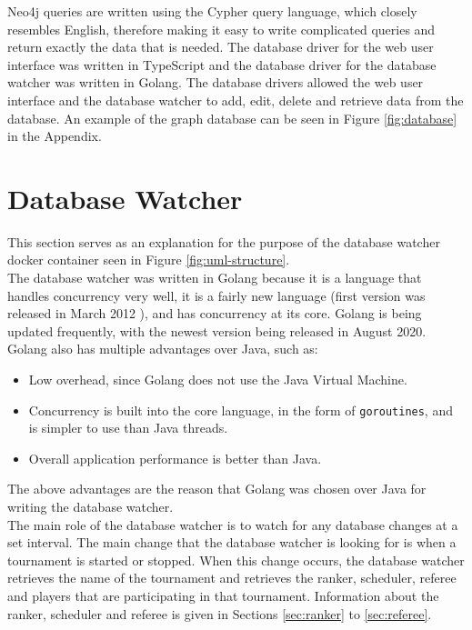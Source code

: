 \documentclass[a4paper, 11pt]{report}
\begin{document}
Neo4j queries are written using the Cypher query language, which closely
resembles English, therefore making it easy to write complicated queries and
return exactly the data that is needed. The database driver for the web user
interface was written in TypeScript and the database driver for the database
watcher was written in Golang. The database drivers allowed the web user interface
and the database watcher to add, edit, delete and retrieve data from the
database. An example of the graph database can be seen in Figure \ref{fig:database}
in the Appendix.

\section{Database Watcher}

This section serves as an explanation for the purpose of the database watcher
docker container seen in Figure \ref{fig:uml-structure}. \\

The database watcher was written in Golang because it is a language that handles
concurrency very well, it is a fairly new language (first version was released
in March 2012 \cite{golang}), and has concurrency at its core. Golang is being
updated frequently, with the newest version being released in August 2020. Golang
also has multiple advantages over Java, such as:
\begin{itemize}
	\item Low overhead, since Golang does not use the Java Virtual Machine.
	\item Concurrency is built into the core language, in the form of \texttt{goroutines},
	and is simpler to use than Java threads.
	\item Overall application performance is better than Java.
\end{itemize}
The above advantages are the reason that Golang was chosen over Java for writing
the database watcher. \\

The main role of the database watcher is to watch for any database changes at a
set interval. The main change that the database watcher is looking for is when a
tournament is started or stopped. When this change occurs, the database watcher
retrieves the name of the tournament and retrieves the ranker, scheduler, referee
and players that are participating in that tournament. Information about the
ranker, scheduler and referee is given in Sections \ref{sec:ranker} to
\ref{sec:referee}.
\end{document}

